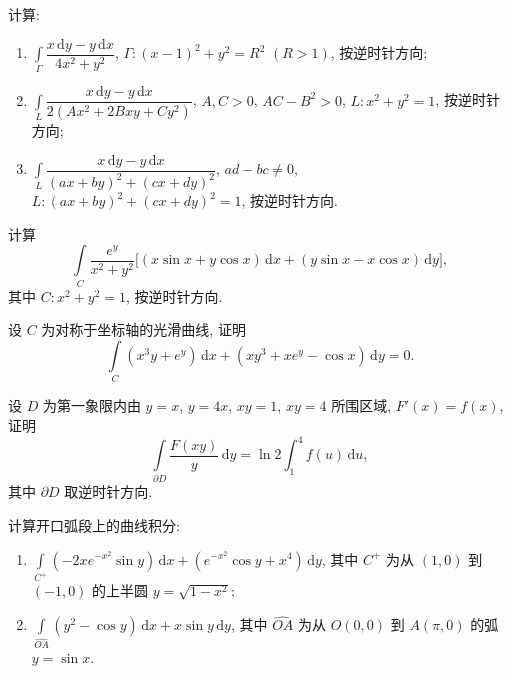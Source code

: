 \documentclass[../数学分析培优讲义.tex]{subfiles}
\begin{document}
\begin{example}
计算:
\begin{enumerate}[label=(\arabic*)]
    \item $\displaystyle\int\limits_\Gamma\dfrac{x\,\mathrm{d}y-y\,\mathrm{d}x}{4x^2+y^2}$, $\Gamma:(x-1)^2+y^2=R^2$ $(R>1)$, 按逆时针方向;
    \item $\displaystyle\int\limits_L\dfrac{x\,\mathrm{d}y-y\,\mathrm{d}x}{2(Ax^2+2Bxy+Cy^2)}$, $A,C>0$, $AC-B^2>0$, $L:x^2+y^2=1$, 按逆时针方向;
    \item $\displaystyle\int\limits_L\dfrac{x\,\mathrm{d}y-y\,\mathrm{d}x}{(ax+by)^2+(cx+dy)^2}$, $ad-bc\ne0$, $L:(ax+by)^2+(cx+dy)^2=1$, 按逆时针方向.
\end{enumerate}
\end{example}
\exampleblank

\begin{example}
计算
\[
    \int\limits_C\dfrac{e^y}{x^2+y^2}
    \bigl\lbrack (x\sin x+y\cos x)\,\mathrm{d}x+(y\sin x-x\cos x)\,\mathrm{d}y\bigr\rbrack,
\]
其中 $C:x^2+y^2=1$, 按逆时针方向.
\end{example}
\exampleblank

\begin{example}
设 $C$ 为对称于坐标轴的光滑曲线, 证明
\[
    \int\limits_C(x^3y+e^y)\,\mathrm{d}x+(xy^3+xe^y-\cos x)\,\mathrm{d}y=0.
\]
\end{example}
\exampleblank

\begin{example}
设 $D$ 为第一象限内由 $y=x$, $y=4x$, $xy=1$, $xy=4$ 所围区域, $F'(x)=f(x)$, 证明
\[
    \int\limits_{\partial D}\dfrac{F(xy)}{y}\,\mathrm{d}y
    =\ln2\int_1^4f(u)\,\mathrm{d}u,
\]
其中 $\partial D$ 取逆时针方向.
\end{example}
\exampleblank

\begin{example}
计算开口弧段上的曲线积分:
\begin{enumerate}[label=(\arabic*)]
    \item $\displaystyle\int\limits_{C^+}(-2xe^{-x^2}\sin y)\,\mathrm{d}x+(e^{-x^2}\cos y+x^4)\,\mathrm{d}y$, 其中 $C^+$ 为从 $(1,0)$ 到 $(-1,0)$ 的上半圆 $y=\sqrt{1-x^2}$;
    \item $\displaystyle\int\limits_{\widehat{OA}}(y^2-\cos y)\,\mathrm{d}x+x\sin y\,\mathrm{d}y$, 其中 $\widehat{OA}$ 为从 $O(0,0)$ 到 $A(\pi,0)$ 的弧 $y=\sin x$.
\end{enumerate}
\end{example}
\exampleblank
\end{document}
